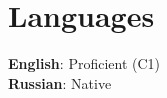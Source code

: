 \documentclass[letterpaper,11pt]{article}
\begin{document}
\section{Languages}
 \begin{itemize}[leftmargin=0.15in, label={}]
    \small{\item{
     \textbf{English}{: Proficient (C1)} \\
     \textbf{Russian}{: Native}
    }}
 \end{itemize}
\end{document}
